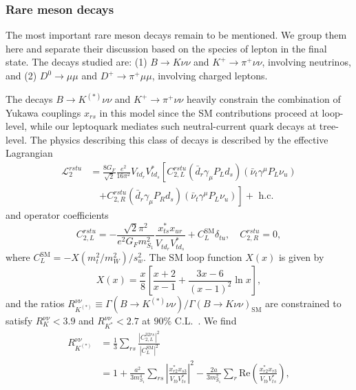 \subsubsection{Rare meson decays}
\label{sec:ch3-raremesondecays}

The most important rare meson decays remain to be mentioned. We group them here
and separate their discussion based on the species of lepton in the final state.
The decays studied are: (1) $B \to K \nu \nu$ and $K^+ \to \pi^+ \nu \nu$,
involving neutrinos, and (2) $D^0 \to \mu \mu$ and $D^+ \to \pi^+ \mu \mu$,
involving charged leptons.

The decays $B \rightarrow K^{(*)} \nu \nu$ and $K^+ \rightarrow \pi^+ \nu \nu$ heavily
constrain the combination of Yukawa couplings $x_{rs}$ in this model since the
SM contributions proceed at loop-level, while our leptoquark mediates such
neutral-current quark decays at tree-level. The physics describing this class of
decays is described by the effective Lagrangian~\cite{Altmannshofer:2009ma,
  Buras:2004uu}
\begin{equation}
  \begin{split}
    \mathscr{L}_2^{rstu}
    &= \frac{8 G_F}{\sqrt{2}} \frac{e^2}{16 \pi^2} V_{t d_r} V^*_{t d_s} \left[ C^{rstu}_{2,L} (\bar{d}_r \gamma_\mu P_{L} d_s)(\bar{\nu}_t
      \gamma^\mu P_L \nu_u) \right. \\ &\quad \left. + C^{rstu}_{2,R} (\bar{d}_r \gamma_\mu P_{R} d_s)(\bar{\nu}_t
      \gamma^\mu P_L \nu_u) \right] + \text{ h.c.}
  \end{split}
\end{equation}
and operator coefficients
\begin{equation}
  C_{2,L}^{rstu} = -\frac{\sqrt{2}\pi^2}{e^2 G_F m_{S_{1}}^2}\frac{x^*_{t s} x_{u r}}{V_{t d_r}V_{t d_s}^*} + C_L^{\text{SM}}\delta_{tu}, \quad C_{2,R}^{rstu} = 0,
\end{equation}
where $C_L^{\text{SM}} = -X(m_t^2/m_W^2)/s_w^2$. The SM loop function $X(x)$ is
given by~\cite{Buras:2004uu, Altmannshofer:2009ma, Buchalla:1998ba,
  Misiak:1999yg}
\begin{equation}
  X(x) = \frac{x}{8} \left[ \frac{x+2}{x-1} + \frac{3x-6}{(x-1)^2} \ln x \right],
\end{equation}
and the ratios
$R_{K^{(*)}}^{\nu\nu} \equiv \Gamma(B\rightarrow K^{(*)} \nu \nu)/\Gamma(B\rightarrow K \nu \nu)_{\text{SM}}$
are constrained to satisfy $R_K^{\nu\nu} < 3.9$ and $R_{K^{*}}^{\nu\nu} < 2.7$
at $90\%$ C.L.~\cite{Grygier:2017tzo}. We find
\begin{equation} \label{eq:ch3-rknunu}
  \begin{split}
    R_{K^{(*)}}^{\nu\nu} &= \frac{1}{3}\sum_{rs}\frac{|C_{2,L}^{32rs} |^2 }{|C_L^{\text{SM}}|^2}\\
    &= 1 + \frac{a^2}{3m_{S_{1}}^4}\sum_{rs}\left|\frac{x^*_{r 2} x_{s 3}}{V_{tb}
        V^*_{ts}}\right|^2 - \frac{2a}{3m_{S_{1}}^2} \sum_r \text{Re} \left(\frac{x^*_{r
        2} x_{r 3}}{V_{tb} V^*_{ts}}\right),
  \end{split}
\end{equation}
